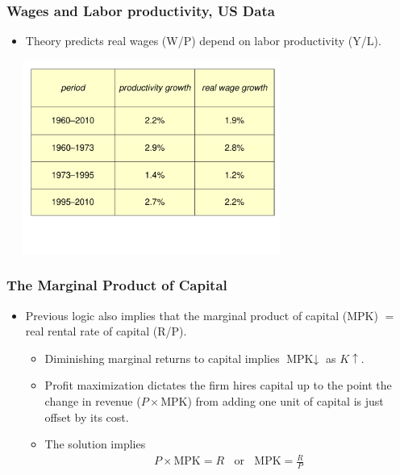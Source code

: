 \documentclass[handout]{beamer}
\begin{document}
\begin{frame}[t]
\frametitle{Wages and Labor productivity, US Data}
\bigskip
\begin{itemize}
\item Theory predicts real wages (W/P) depend on labor productivity (Y/L).
\end{itemize}
\begin{center}
\includegraphics[height=2.5in,width=3.75in]{../Figures/wage_data.pdf}
\end{center}
\end{frame}


\begin{frame}[t]
\frametitle{The Marginal Product of Capital}
\begin{itemize}
\item Previous logic also implies that the marginal product of capital (MPK) $=$ real rental rate of capital (R/P).
\begin{itemize}
\bigskip
\item Diminishing marginal returns to capital implies $\mbox{MPK}\downarrow$ as $K\uparrow$.
\bigskip
\item Profit maximization dictates the firm hires capital up to the point the change in revenue ($P \times \mbox{MPK}$) from adding one unit of capital is just offset by its cost.
\bigskip
\item The solution implies
\begin{eqnarray*}
P \times \mbox{MPK} = R \ \ \ \ \mbox{or} \ \ \ \ \mbox{MPK} = \frac{R}{P}
\end{eqnarray*}
\end{itemize}
\end{itemize}
\end{frame}
\end{document}

